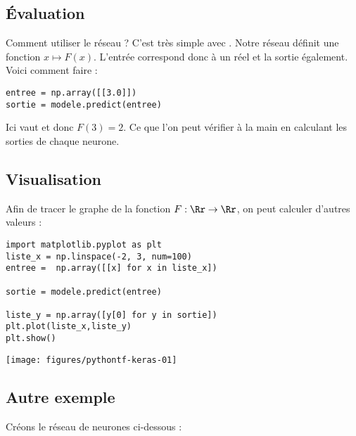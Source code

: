 \documentclass[11pt,class=report,crop=false]{standalone}
\begin{document}
\subsection{Évaluation}

Comment utiliser le réseau ? C'est très simple avec .
 Notre réseau définit une fonction $x \mapsto F(x)$. L'entrée correspond donc à un réel et la sortie également. Voici comment faire :
\begin{lstlisting}
entree = np.array([[3.0]])
sortie = modele.predict(entree)
\end{lstlisting}
Ici  vaut \ci{[[2.0]]} et donc 
$F(3) = 2$. Ce que l'on peut vérifier à la main en calculant les sorties de chaque neurone.



\subsection{Visualisation}
Afin de tracer le graphe de la fonction $F: \Rr \to \Rr$, on peut calculer d'autres valeurs :

\begin{minipage}{0.64\textwidth}
\begin{lstlisting}
import matplotlib.pyplot as plt
liste_x = np.linspace(-2, 3, num=100)
entree =  np.array([[x] for x in liste_x])

sortie = modele.predict(entree)

liste_y = np.array([y[0] for y in sortie])
plt.plot(liste_x,liste_y)
plt.show()
\end{lstlisting}
\end{minipage}
\begin{minipage}{0.35\textwidth}
\begin{center}
\texttt{[image: figures/pythontf-keras-01]}
\end{center}
\end{minipage}

\subsection{Autre exemple}

Créons le réseau de neurones ci-dessous :

\end{document}

